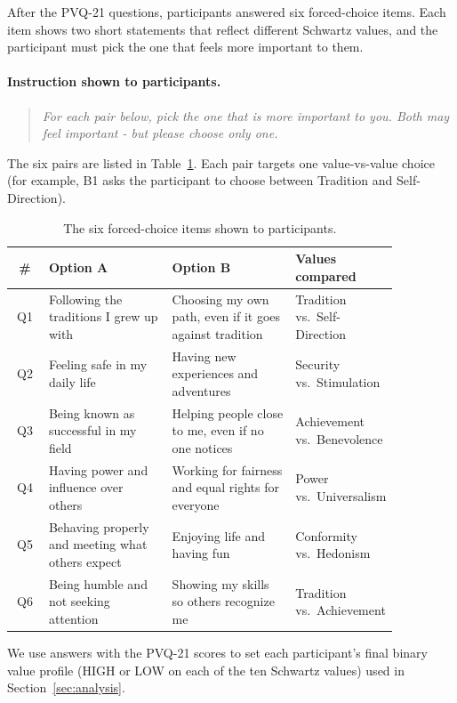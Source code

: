 After the PVQ-21 questions, participants answered six forced-choice items. Each item shows two short statements that reflect different Schwartz values, and the participant must pick the one that feels more important to them.

\paragraph{Instruction shown to participants.}
\begin{quote}\itshape
For each pair below, pick the one that is more important to you. Both may feel important - but please choose only one.
\end{quote}

The six pairs are listed in Table~\ref{tab:block_b}. Each pair targets one value-vs-value choice (for example, B1 asks the participant to choose between Tradition and Self-Direction).

\begin{table}[t]
\centering\footnotesize
\setlength{\tabcolsep}{4pt}
\renewcommand{\arraystretch}{1.2}
\begin{tabular}{@{}c p{0.32\linewidth} p{0.32\linewidth} p{0.22\linewidth}@{}}
\toprule
\textbf{\#} & \textbf{Option A} & \textbf{Option B} & \textbf{Values compared} \\
\midrule
Q1 & Following the traditions I grew up with & Choosing my own path, even if it goes against tradition & Tradition vs.\ Self-Direction \\
Q2 & Feeling safe in my daily life & Having new experiences and adventures & Security vs.\ Stimulation \\
Q3 & Being known as successful in my field & Helping people close to me, even if no one notices & Achievement vs.\ Benevolence \\
Q4 & Having power and influence over others & Working for fairness and equal rights for everyone & Power vs.\ Universalism \\
Q5 & Behaving properly and meeting what others expect & Enjoying life and having fun & Conformity vs.\ Hedonism \\
Q6 & Being humble and not seeking attention & Showing my skills so others recognize me & Tradition vs.\ Achievement \\
\bottomrule
\end{tabular}
\caption{The six forced-choice items shown to participants.}
\label{tab:block_b}
\end{table}

We use answers with the PVQ-21 scores to set each participant's final binary value profile (HIGH or LOW on each of the ten Schwartz values) used in Section~\ref{sec:analysis}.


